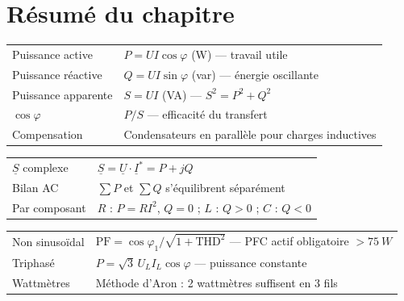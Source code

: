 \documentclass[12pt,a4paper,twoside]{book}
\begin{document}
\section*{Résumé du chapitre}

\begin{bases}[title={\color{white} Résumé --- Les Bases}]
\begin{center}
\renewcommand{\arraystretch}{1.3}
\begin{tabular}{p{4cm}p{9cm}}
\toprule
Puissance active & $P = UI\cos\varphi$ (W) --- travail utile \\
Puissance réactive & $Q = UI\sin\varphi$ (var) --- énergie oscillante \\
Puissance apparente & $S = UI$ (VA) --- $S^2 = P^2 + Q^2$ \\
$\cos\varphi$ & $P/S$ --- efficacité du transfert \\
Compensation & Condensateurs en parallèle pour charges inductives \\
\bottomrule
\end{tabular}
\end{center}
\end{bases}

\begin{approfondissement}[title={\color{white} Résumé --- Approfondissement}]
\begin{center}
\renewcommand{\arraystretch}{1.3}
\begin{tabular}{p{4cm}p{9cm}}
\toprule
$\underline{S}$ complexe & $\underline{S} = \underline{U}\cdot\underline{I}^* = P + jQ$ \\
Bilan AC & $\sum P$ et $\sum Q$ s'équilibrent séparément \\
Par composant & $R$ : $P = RI^2$, $Q=0$ ; $L$ : $Q > 0$ ; $C$ : $Q < 0$ \\
\bottomrule
\end{tabular}
\end{center}
\end{approfondissement}

\begin{ingenieur}[title={\color{white} Résumé --- Niveau Ingénieur}]
\begin{center}
\renewcommand{\arraystretch}{1.3}
\begin{tabular}{p{4cm}p{9cm}}
\toprule
Non sinusoïdal & $\text{PF} = \cos\varphi_1 / \sqrt{1+\text{THD}^2}$ --- PFC actif obligatoire $>\SI{75}{W}$ \\
Triphasé & $P = \sqrt{3}\,U_L I_L \cos\varphi$ --- puissance constante \\
Wattmètres & Méthode d'Aron : 2 wattmètres suffisent en 3 fils \\
\bottomrule
\end{tabular}
\end{center}
\end{ingenieur}
\end{document}

